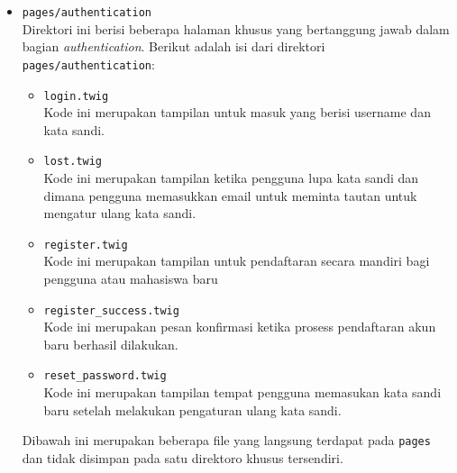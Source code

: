\begin{itemize}
\begin{itemize}
		      \item \verb|pages/authentication| \\
                    Direktori ini berisi beberapa halaman khusus yang bertanggung jawab dalam bagian \textit{authentication}. Berikut adalah isi dari direktori \verb|pages/authentication|:
		            \begin{itemize}
			            \item \verb|login.twig| \\
                        Kode ini merupakan tampilan untuk masuk yang berisi username dan kata sandi.
			            \item \verb|lost.twig| \\
                        Kode ini merupakan tampilan ketika pengguna lupa kata sandi dan dimana pengguna memasukkan email untuk meminta tautan untuk mengatur ulang kata sandi.
			            \item \verb|register.twig| \\
                        Kode ini merupakan tampilan untuk pendaftaran secara mandiri bagi pengguna atau mahasiswa baru
			            \item \verb|register_success.twig| \\
                        Kode ini merupakan pesan konfirmasi ketika prosess pendaftaran akun baru berhasil dilakukan.
			            \item \verb|reset_password.twig| \\
                        Kode ini merupakan tampilan tempat pengguna memasukan kata sandi baru setelah melakukan pengaturan ulang kata sandi.
		            \end{itemize}

            Dibawah ini merupakan beberapa file yang langsung terdapat pada \verb|pages| dan tidak disimpan pada satu direktoro khusus tersendiri.
            

\end{itemize}
\end{itemize}
